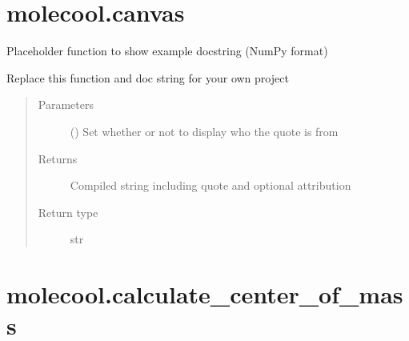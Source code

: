 \documentclass[letterpaper,10pt,english]{sphinxmanual}
\begin{document}
\section{molecool.canvas}
\label{\detokenize{autosummary/molecool.canvas:molecool-canvas}}\label{\detokenize{autosummary/molecool.canvas::doc}}

\begin{fulllineitems}
\label{\detokenize{autosummary/molecool.canvas:molecool.canvas}}
Placeholder function to show example docstring (NumPy format)

Replace this function and doc string for your own project
\begin{quote}\begin{description}
\item[{Parameters}] \leavevmode
{} () \textendash{} Set whether or not to display who the quote is from

\item[{Returns}] \leavevmode
{} \textendash{} Compiled string including quote and optional attribution

\item[{Return type}] \leavevmode
str

\end{description}\end{quote}

\end{fulllineitems}



\section{molecool.calculate\_center\_of\_mass}
\label{\detokenize{autosummary/molecool.calculate_center_of_mass:molecool-calculate-center-of-mass}}\label{\detokenize{autosummary/molecool.calculate_center_of_mass::doc}}
\end{document}
